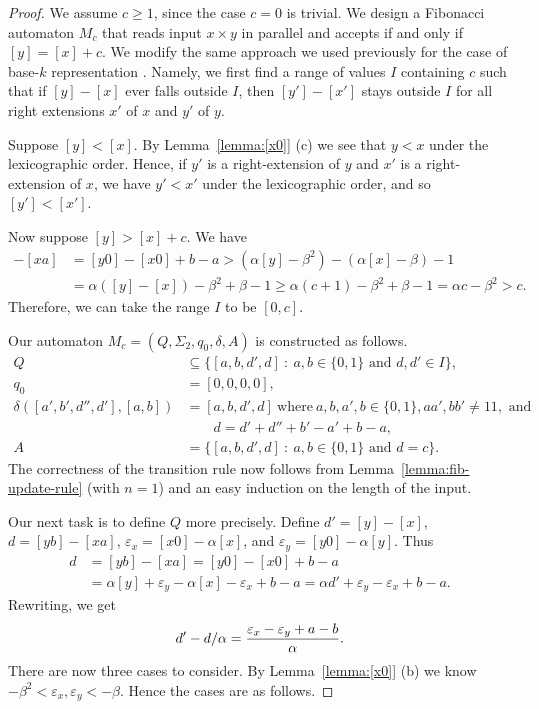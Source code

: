 \documentclass[12pt,reqno]{article}
\def\suchthat{\ : \ }
\begin{document}
\begin{proof}
We assume $c\geq 1$, since the case $c = 0$ is trivial.
 We design a Fibonacci automaton $M_c$ that reads input $x\times y$ in parallel and accepts if and only if $[y]=[x]+c$.
We modify the same approach we used previously for the case of base-$k$ representation \cite{moradi_complexity_2026}.
Namely, we first find a range of values $I$ containing $c$ such that if $[y]-[x]$ ever falls outside $I$, then $[y']-[x']$ stays outside $I$ for all right extensions $x'$ of $x$ and $y'$ of $y$. 

Suppose $[y]<[x]$. By Lemma~\ref{lemma:[x0]} (c) we see that $y < x$ under the lexicographic order.   Hence, if $y'$ is a right-extension of $y$ and $x'$ is a right-extension of $x$, we have
$y' < x'$ under the lexicographic order, and so $[y'] < [x']$.  

Now suppose $[y] > [x]+ c $.  We have
\begin{align*}
    [yb] - [xa] &= [y0] - [x0] + b -a 
    > (\alpha[y]-\beta^2) - (\alpha[x]-\beta) - 1 \\
    &= \alpha ([y]-[x]) - \beta^2 + \beta - 1 
    \geq \alpha (c+1) - \beta^2 + \beta - 1 
    = \alpha c- \beta^2 
    > c.
\end{align*}
Therefore, we can take the range $I$ to be $[0,c]$.

Our automaton $M_c=(Q, \Sigma_2, q_0, \delta, A)$ is constructed as follows.
\begin{align*}
     Q &\subseteq \{[a, b, d', d] \suchthat a, b \in \{ 0,1 \} \text{ and } d, d' \in I\}, \\
     q_0 &= [0, 0, 0, 0], \\
     \delta([a', b', d'', d'], [a, b]) &= [a, b, d', d] \ \text{where} \ a,b,a',b \in \{0,1\}, aa', bb' \not=11, \text{ and } \\
     & \quad\quad d= d'
     + d'' +b' - a' + b - a, \\
     A &= \{[a, b, d', d] \suchthat a, b \in \{0,1 \} \text{ and } d = c\}.
 \end{align*}
The correctness of the transition rule now follows from Lemma~\ref{lemma:fib-update-rule} (with $n=1$) and an easy induction on the length of the input.

Our next task is to define $Q$ more precisely. 
Define $d' = [y]-[x]$, $d = [yb]-[xa]$,
$\varepsilon_x = [x0] - \alpha [x]$, and $\varepsilon_y = [y0] - \alpha [y]$.    Thus
\begin{align*}
d &= [yb] - [xa] 
= [y0]-[x0] + b-a \\
&= \alpha[y] + \varepsilon_y - \alpha[x] - \varepsilon_x + b-a = \alpha d' + \varepsilon_y - \varepsilon_x + b-a.
\end{align*}
Rewriting, we get
\begin{equation}
 d' - d/\alpha = {{\varepsilon_x -  \varepsilon_y +a-b} \over \alpha}.
 \label{equation:d'-d/alpha}
 \end{equation}
There are now three cases to consider.  By Lemma~\ref{lemma:[x0]} (b) we know $-\beta^2 < \varepsilon_x, \varepsilon_y < -\beta$. Hence the cases are as follows.


\end{proof}
\end{document}
